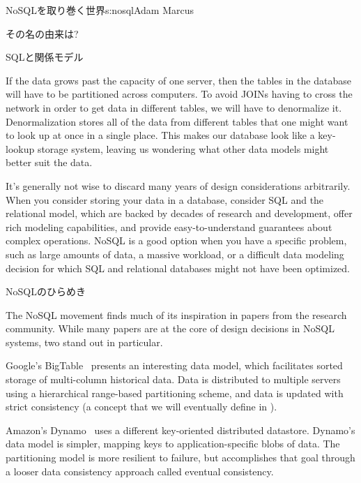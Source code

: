 \begin{aosachapter}{NoSQLを取り巻く世界}{s:nosql}{Adam Marcus}
\begin{aosasect1}{その名の由来は?}
\begin{aosasect2}{SQLと関係モデル}
\begin{aosaitemize}
  \item If the data grows past the capacity of one server, then the
  tables in the database will have to be partitioned across computers.
  To avoid JOINs having to cross the network in order to get data in
  different tables, we will have to denormalize it.  Denormalization
  stores all of the data from different tables that one might want to
  look up at once in a single place.  This makes our database look
  like a key-lookup storage system, leaving us wondering what other
  data models might better suit the data.

\end{aosaitemize}

It's generally not wise to discard many years of design considerations
arbitrarily.  When you consider storing your data in a database,
consider SQL and the relational model, which are backed by decades of
research and development, offer rich modeling capabilities, and
provide easy-to-understand guarantees about complex operations.  NoSQL
is a good option when you have a specific problem, such as large
amounts of data, a massive workload, or a difficult data modeling
decision for which SQL and relational databases might not have been
optimized.

\end{aosasect2}

\begin{aosasect2}{NoSQLのひらめき}

The NoSQL movement finds much of its inspiration in papers from the
research community.  While many papers are at the core of design
decisions in NoSQL systems, two stand out in particular.

Google's BigTable~\cite{bib:bigtable} presents an interesting data model,
which facilitates sorted storage of multi-column historical data.
Data is distributed to multiple servers using a hierarchical
range-based partitioning scheme, and data is updated with strict
consistency (a concept that we will eventually define in
).

Amazon's Dynamo~\cite{bib:amazon:dynamo} uses a different key-oriented distributed datastore.
Dynamo's data model is simpler, mapping keys to application-specific
blobs of data.  The partitioning model is more resilient to failure,
but accomplishes that goal through a looser data consistency approach
called eventual consistency.


\end{aosasect2}
\end{aosasect1}
\end{aosachapter}
